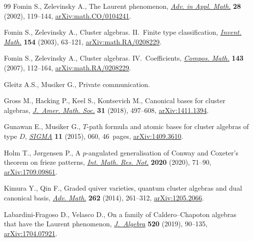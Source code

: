 \documentclass[pdftex]{sigma}%
\numberwithin{equation}{section}
\begin{document}
\begin{thebibliography}{99}
Fomin S., Zelevinsky A., The {L}aurent phenomenon, \href{https://doi.org/10.1006/aama.2001.0770}{\textit{Adv. in Appl. Math.}}
 \textbf{28} (2002), 119--144, \href{https://arxiv.org/abs/math.CO/0104241}{arXiv:math.CO/0104241}.

Fomin S., Zelevinsky A., Cluster algebras. {II}.~{F}inite type classification,
 \href{https://doi.org/10.1007/s00222-003-0302-y}{\textit{Invent. Math.}} \textbf{154} (2003), 63--121,
 \href{https://arxiv.org/abs/math.RA/0208229}{arXiv:math.RA/0208229}.

Fomin S., Zelevinsky A., Cluster algebras. {IV}.~{C}oefficients,
 \href{https://doi.org/10.1112/S0010437X06002521}{\textit{Compos. Math.}} \textbf{143} (2007), 112--164,
 \href{https://arxiv.org/abs/math.RA/0208229}{arXiv:math.RA/0208229}.

Gleitz A.S., Musiker G., {P}rivate communication.

Gross M., Hacking P., Keel S., Kontsevich M., Canonical bases for cluster
 algebras, \href{https://doi.org/10.1090/jams/890}{\textit{J.~Amer. Math. Soc.}} \textbf{31} (2018), 497--608,
 \href{https://arxiv.org/abs/1411.1394}{arXiv:1411.1394}.

Gunawan E., Musiker G., {$T$}-path formula and atomic bases for cluster
 algebras of type {$D$}, \href{https://doi.org/10.3842/SIGMA.2015.060}{\textit{SIGMA}} \textbf{11} (2015), 060, 46~pages,
 \href{https://arxiv.org/abs/1409.3610}{arXiv:1409.3610}.

Holm T., J{\o}rgensen P., A {$p$}-angulated generalisation of {C}onway and
 {C}oxeter's theorem on frieze patterns, \href{https://doi.org/10.1093/imrn/rny020}{\textit{Int. Math. Res. Not.}}
 \textbf{2020} (2020), 71--90, \href{https://arxiv.org/abs/1709.09861}{arXiv:1709.09861}.

Kimura Y., Qin F., Graded quiver varieties, quantum cluster algebras and dual
 canonical basis, \href{https://doi.org/10.1016/j.aim.2014.05.014}{\textit{Adv. Math.}} \textbf{262} (2014), 261--312,
 \href{https://arxiv.org/abs/1205.2066}{arXiv:1205.2066}.

Labardini-Fragoso D., Velasco D., On a family of {C}aldero--{C}hapoton algebras
 that have the {L}aurent phenomenon, \href{https://doi.org/10.1016/j.jalgebra.2018.11.012}{\textit{J.~Algebra}} \textbf{520} (2019),
 90--135, \href{https://arxiv.org/abs/1704.07921}{arXiv:1704.07921}.


\end{thebibliography}
\end{document}
